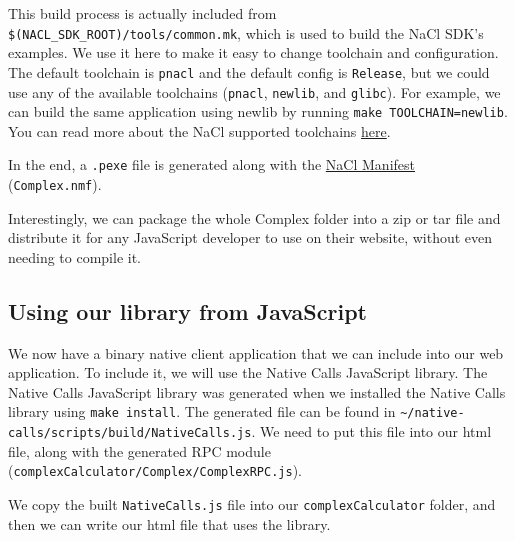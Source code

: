 This build process is actually included from
\texttt{\$(NACL\_SDK\_ROOT)/tools/common.mk}, which is used to build the
NaCl SDK's examples. We use it here to make it easy to change toolchain
and configuration. The default toolchain is \texttt{pnacl} and the
default config is \texttt{Release}, but we could use any of the
available toolchains (\texttt{pnacl}, \texttt{newlib}, and
\texttt{glibc}). For example, we can build the same application using
newlib by running \texttt{make TOOLCHAIN=newlib}. You can read more
about the NaCl supported toolchains
\href{https://developer.chrome.com/native-client/devguide/devcycle/building}{here}.

In the end, a \texttt{.pexe} file is generated along with the
\href{https://developer.chrome.com/native-client/reference/nacl-manifest-format}{NaCl
Manifest} (\texttt{Complex.nmf}).

Interestingly, we can package the whole Complex folder into a zip or tar
file and distribute it for any JavaScript developer to use on their
website, without even needing to compile it.

\subsection{Using our library from
JavaScript}\label{using-our-library-from-javascript}

We now have a binary native client application that we can include into
our web application. To include it, we will use the Native Calls
JavaScript library. The Native Calls JavaScript library was generated
when we installed the Native Calls library using \texttt{make install}.
The generated file can be found in
\texttt{\textasciitilde{}/native-calls/scripts}\texttt{/build/NativeCalls.js}. We
need to put this file into our html file, along with the generated RPC
module (\texttt{complexCalculator/Complex/ComplexRPC.js}).

We copy the built \texttt{NativeCalls.js} file into our
\texttt{complexCalculator} folder, and then we can write our html file
that uses the library.

\begin{Shaded}
\begin{Highlighting}[]
 
 
\end{Highlighting}
\end{Shaded}

